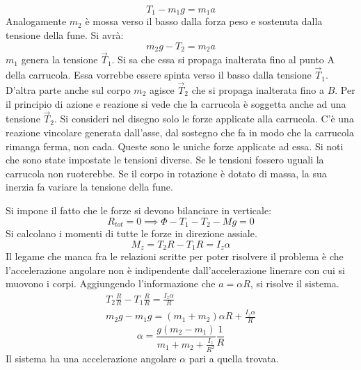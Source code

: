 \documentclass[10pt,a4paper]{book}
\begin{document}
\[
	T_1 - m_1 g = m_1 a
\]
Analogamente $m_2$ è mossa verso il basso dalla forza peso e sostenuta dalla tensione della fune. Si avrà:
\[
	m_2 g - T_2 = m_2 a
\]
$m_1$ genera la tensione $\vec{T}_1$. Si sa che essa si propaga inalterata fino al punto A della carrucola. Essa vorrebbe essere spinta verso il basso dalla tensione $\vec{T}_1$. D'altra parte anche sul corpo $m_2$ agisce $\vec{T}_2$ che si propaga inalterata fino a $B$. Per il principio di azione e reazione si vede che la carrucola è soggetta anche ad una tensione $\vec{T}_2$. Si consideri nel disegno solo le forze applicate alla carrucola. C'è una reazione vincolare generata dall'asse, dal sostegno che fa in modo che la carrucola rimanga ferma, non cada. Queste sono le uniche forze applicate ad essa. Si noti che sono state impostate le tensioni diverse. Se le tensioni fossero uguali la carrucola non ruoterebbe. Se il corpo in rotazione è dotato di massa, la sua inerzia fa variare la tensione della fune.

Si impone il fatto che le forze si devono bilanciare in verticale:
\[
	R_{tot} = 0 \implies \Phi - T_1 - T_2 - Mg = 0
\]
Si calcolano i momenti di tutte le forze in direzione assiale.
\[
	M_z = T_2 R - T_1 R = I_z\alpha
\]
Il legame che manca fra le relazioni scritte per poter risolvere il problema è che l'accelerazione angolare non è indipendente dall'accelerazione linerare con cui si muovono i corpi. Aggiungendo l'informazione che $a=\alpha R$, si risolve il sistema.
\begin{gather*}
	T_2\frac{R}{R} - T_1 \frac{R}{R} =  \frac{I_z \alpha  }{R} \\
	m_2 g - m_1 g = (m_1+m_2)\alpha R + \frac{I_z\alpha  }{R}
\end{gather*}
\[
	\boxed{\alpha = \frac{g(m_2-m_1)}{m_1+m_2+ \frac{I_z }{R^2}}\frac{1}{R}}
\]
Il sistema ha una accelerazione angolare $\alpha$ pari a quella trovata.
\end{document}
